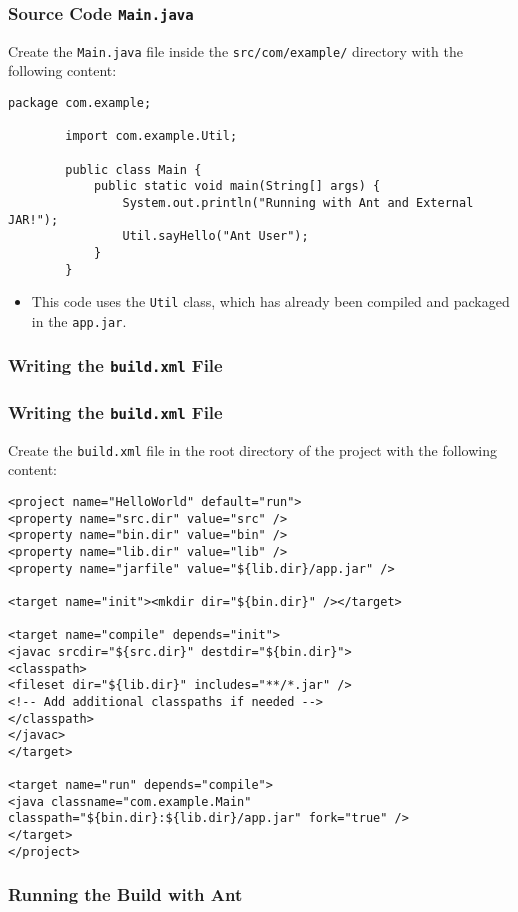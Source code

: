 \documentclass[aspectratio=169, table]{beamer}
\begin{document}
\begin{frame}[fragile]
	\frametitle{Source Code \texttt{Main.java}}
	Create the \texttt{Main.java} file inside the \texttt{src/com/example/} directory with the following content:
	\begin{lstlisting}[style=JavaStyle]
		package com.example;
		
		import com.example.Util;
		
		public class Main {
			public static void main(String[] args) {
				System.out.println("Running with Ant and External JAR!");
				Util.sayHello("Ant User");
			}
		}
	\end{lstlisting}
	\begin{itemize}
		\item This code uses the \texttt{Util} class, which has already been compiled and packaged in the \texttt{app.jar}.
	\end{itemize}
\end{frame}

\subsubsection{Writing the \texttt{build.xml} File}

\begin{frame}[fragile]
	\vspace{20pt}
	\frametitle{Writing the \texttt{build.xml} File}
	Create the \texttt{build.xml} file in the root directory of the project with the following content:
	\begin{lstlisting}[style=XmlStyle]
<project name="HelloWorld" default="run">
<property name="src.dir" value="src" />
<property name="bin.dir" value="bin" />
<property name="lib.dir" value="lib" />
<property name="jarfile" value="${lib.dir}/app.jar" />

<target name="init"><mkdir dir="${bin.dir}" /></target>

<target name="compile" depends="init">
<javac srcdir="${src.dir}" destdir="${bin.dir}">
<classpath>
<fileset dir="${lib.dir}" includes="**/*.jar" />
<!-- Add additional classpaths if needed -->
</classpath>
</javac>
</target>

<target name="run" depends="compile">
<java classname="com.example.Main" classpath="${bin.dir}:${lib.dir}/app.jar" fork="true" />
</target>
</project>
	\end{lstlisting}
\end{frame}

\subsubsection{Running the Build with Ant}
\end{document}
